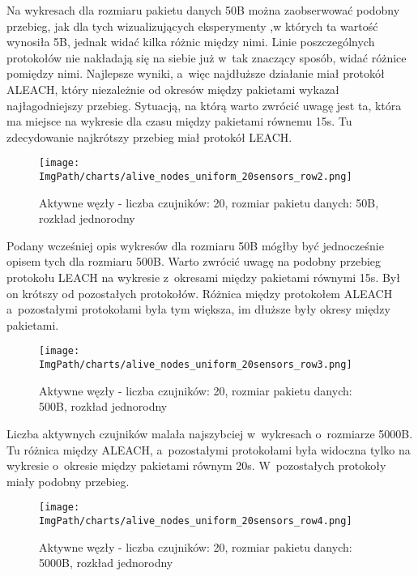 Na wykresach dla rozmiaru pakietu danych 50B można zaobserwować podobny przebieg, jak dla tych wizualizujących eksperymenty ,w których ta wartość wynosiła 5B, jednak widać kilka różnic między nimi. Linie poszczególnych protokołów nie nakładają się na siebie już w~tak znaczący sposób, widać różnice pomiędzy nimi. Najlepsze wyniki, a~więc najdłuższe działanie miał protokół ALEACH, który niezależnie od okresów między pakietami wykazał najłagodniejszy przebieg. Sytuacją, na którą warto zwrócić uwagę jest ta, która ma miejsce na wykresie dla czasu między pakietami równemu 15s. Tu zdecydowanie najkrótszy przebieg miał protokół LEACH.

\begin{figure}[H]
	\begin{center}
		\texttt{[image: \\ImgPath/charts/alive\_nodes\_uniform\_20sensors\_row2.png]}
	\end{center}
	\caption{Aktywne węzły - liczba czujników: 20, rozmiar pakietu danych: 50B, rozkład jednorodny}
\end{figure}

 Podany wcześniej opis wykresów dla rozmiaru 50B mógłby być jednocześnie opisem tych dla rozmiaru 500B. Warto zwrócić uwagę na podobny przebieg protokołu LEACH na wykresie z~okresami między pakietami równymi 15s. Był on krótszy od pozostałych protokołów. Różnica między protokołem ALEACH a~pozostałymi protokołami była tym większa, im dłuższe były okresy między pakietami.

\begin{figure}[H]
	\begin{center}
		\texttt{[image: \\ImgPath/charts/alive\_nodes\_uniform\_20sensors\_row3.png]}
	\end{center}
	\caption{Aktywne węzły - liczba czujników: 20, rozmiar pakietu danych: 500B, rozkład jednorodny}
\end{figure} 
  
Liczba aktywnych czujników malała najszybciej w~wykresach o~rozmiarze 5000B. Tu różnica między ALEACH, a~pozostałymi protokołami była widoczna tylko na wykresie o~okresie między pakietami równym 20s. W~pozostałych protokoły miały podobny przebieg. 

\begin{figure}[H]
	\begin{center}
		\texttt{[image: \\ImgPath/charts/alive\_nodes\_uniform\_20sensors\_row4.png]}
	\end{center}
	\caption{Aktywne węzły - liczba czujników: 20, rozmiar pakietu danych: 5000B, rozkład jednorodny}
\end{figure}


